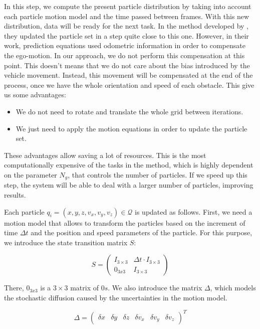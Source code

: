 In this step, we compute the present particle distribution by taking into account each particle motion model and the time passed between frames. With this new distribution, data will be ready for the next task. In the method developed by \cite{danescu2012particle}, they updated the particle set in a step quite close to this one. However, in their work, prediction equations used odometric information in order to compensate the ego-motion. In our approach, we do not perform this compensation at this point. This doesn't means that we do not care about the bias introduced by the vehicle movement. Instead, this movement will be compensated at the end of the process, once we have the whole orientation and speed of each obstacle. This give us some advantages:
\begin{itemize}
 \item We do not need to rotate and translate the whole grid between iterations.
 \item We just need to apply the motion equations in order to update the particle set.
\end{itemize}

These advantages allow saving a lot of resources. This is the most computationally expensive of the tasks in the method, which is highly dependent on the parameter $N_g$, that controls the number of particles. If we speed up this step, the system will be able to deal with a larger number of particles, improving results.

Each particle $q_i = (x, y, z, v_x, v_y, v_z) \in \mathcal{Q}$ is updated as follows. First, we need a motion model that allows to transform the particles based on the increment of time $\Delta t$ and the position and speed parameters of the particle. For this purpose, we introduce the state transition matrix $S$:

\begin{equation}\label{eq:cp05_state_transition_matrix}
S =
\left( \begin{array}{cc}
I_{3\times3} & \Delta t \cdot I_{3\times3} \\
0_{3x3} & I_{3\times3} \end{array} \right)
\end{equation}

There, $0_{3x3}$ is a $3 \times 3$ matrix of $0s$. We also introduce the matrix $\Delta$, which models the stochastic diffusion caused by the uncertainties in the motion model.

\begin{equation}\label{eq:cp05_state_motion_model_uncertainties}
\Delta =
\left( \begin{array}{cccccc}
\delta x & \delta y & \delta z & \delta v_x & \delta v_y & \delta v_z
\end{array} \right)^T
\end{equation}

